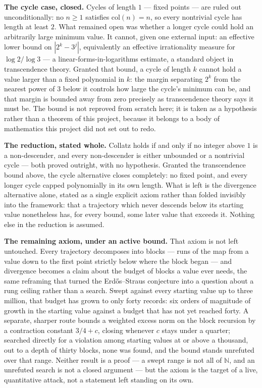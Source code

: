 \documentclass[12pt,a4paper]{article}
\makeatletter
\renewcommand{\_}{\ig@origunderscore\discretionary{}{}{}}
\makeatother
\begin{document}
\textbf{The cycle case, closed.} Cycles of length $1$ --- fixed points --- are ruled
out unconditionally: no $n \geq 1$ satisfies $\mathrm{col}(n) = n$, so every nontrivial
cycle has length at least $2$. What remained open was whether a longer cycle could hold
an arbitrarily large minimum value. It cannot, given one external input: an effective
lower bound on $|2^k - 3^j|$, equivalently an effective irrationality measure for
$\log 2 / \log 3$ --- a linear-forms-in-logarithms estimate, a standard object in
transcendence theory. Granted that bound, a cycle of length $k$ cannot hold a value
larger than a fixed polynomial in $k$: the margin separating $2^k$ from the nearest
power of $3$ below it controls how large the cycle's minimum can be, and that margin is
bounded away from zero precisely as transcendence theory says it must be. The bound is
not reproved from scratch here; it is taken as a hypothesis rather than a theorem of
this project, because it belongs to a body of mathematics this project did not set out
to redo.

\textbf{The reduction, stated whole.} Collatz holds if and only if no integer above $1$
is a non-descender, and every non-descender is either unbounded or a nontrivial cycle
--- both proved outright, with no hypothesis. Granted the transcendence bound above,
the cycle alternative closes completely: no fixed point, and every longer cycle capped
polynomially in its own length. What is left is the divergence alternative alone,
stated as a single explicit axiom rather than folded invisibly into the framework: that
a trajectory which never descends below its starting value nonetheless has, for every
bound, some later value that exceeds it. Nothing else in the reduction is assumed.

\textbf{The remaining axiom, under an active bound.} That axiom is not left untouched.
Every trajectory decomposes into blocks --- runs of the map from a value down to the
first point strictly below where the block began --- and divergence becomes a claim
about the budget of blocks a value ever needs, the same reframing that turned the
Erdős--Straus conjecture into a question about a rung ceiling rather than a search.
Swept against every starting value up to three million, that budget has grown to only
forty records: six orders of magnitude of growth in the starting value against a
budget that has not yet reached forty. A separate, sharper route bounds a weighted
excess norm on the block recursion by a contraction constant $3/4 + c$, closing
whenever $c$ stays under a quarter; searched directly for a violation among starting
values at or above a thousand, out to a depth of thirty blocks, none was found, and the
bound stands unrefuted over that range. Neither result is a proof --- a swept range is
not all of $\mathbb{N}$, and an unrefuted search is not a closed argument --- but the
axiom is the target of a live, quantitative attack, not a statement left standing on
its own.
\end{document}
